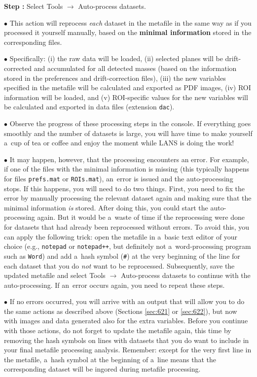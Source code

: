 \documentclass[a4paper, 11pt]{article}
\newcommand{\ttt}[1]{\texttt{#1}}
\newcommand{\lans}[1]{{\color{magenta}#1}}
\newcommand\ra{\rightarrow}
\newcounter{step}
\newcommand\s{\addtocounter{step}{1}\noindent\textbf{Step \thestep:}{ }}
\newcommand\bul{\noindent$\bullet${ }}
\newcommand\bb[1]{\textbf{#1}}
\begin{document}
\s Select \lans{Tools} $\ra$ \lans{Auto-process datasets}.

\bul This action will reprocess \emph{each} dataset in the metafile in the same way as if you processed it yourself manually, based on the \bb{minimal information} stored in the corresponding files. 

\bul Specifically: (i) the raw data will be loaded, (ii) selected planes will be drift-corrected and accumulated for all detected masses (based on the information stored in the preferences and drift-correction files), (iii) the new variables specified in the metafile will be calculated and exported as PDF images, (iv) ROI information will be loaded, and (v) ROI-specific values for the new variables will be calculated and exported in data files (extension \ttt{dac}).

\bul Observe the progress of these processing steps in the console. If everything goes smoothly and the number of datasets is large, you will have time to make yourself a~cup of tea or coffee and enjoy the moment while LANS is doing the work! 

\bul It may happen, however, that the processing encounters an error. For example, if one of the files with the minimal information is missing (this typically happens for files \ttt{prefs.mat} or \ttt{ROIs.mat}), an~error is issued and the auto-processing stops. If this happens, you will need to do two things. First, you need to fix the error by manually processing the relevant dataset again and making sure that the minimal information \emph{is} stored. After doing this, you could start the auto-processing again. But it would be a~waste of time if the reprocessing were done for datasets that had already been reprocessed without errors. To avoid this, you can apply the following trick: open the metafile in a~basic text editor of your choice (e.g., \ttt{notepad} or \ttt{notepad++}, but definitely not a~word-processing program such as \ttt{Word}) and add a~hash symbol (\ttt{\#}) at the very beginning of the line for each dataset that you do \emph{not} want to be reprocessed. Subsequently, save the updated metafile and select \lans{Tools} $\ra$ \lans{Auto-process datasets} to continue with the auto-processing. If an~error occurs again, you need to repeat these steps.

\bul If no errors occurred, you will arrive with an output that will allow you to do the same actions as described above (Sections \ref{sec:621} or \ref{sec:622}), but now with images and data generated also for the extra variables. Before you continue with those actions, do not forget to update the metafile again, this time by removing the hash symbols on lines with datasets that you do want to include in your final metafile processing analysis. Remember: except for the very first line in the metafile, a~hash symbol at the beginning of a~line means that the corresponding dataset will be ingored during metafile processing.
\end{document}
